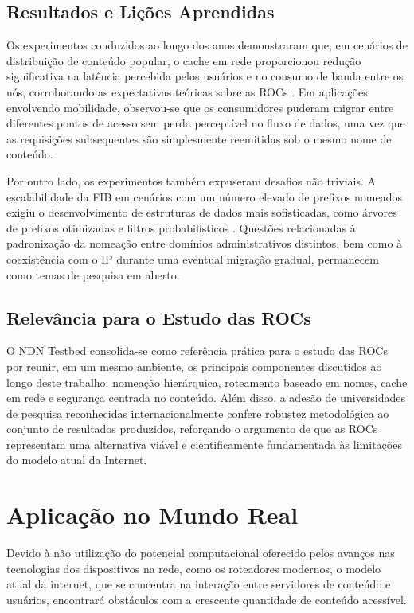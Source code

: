 \documentclass[12pt]{article}
\begin{document}
\subsection{Resultados e Lições Aprendidas}

Os experimentos conduzidos ao longo dos anos demonstraram que, em cenários de distribuição de conteúdo popular, o cache em rede proporcionou redução significativa na latência percebida pelos usuários e no consumo de banda entre os nós, corroborando as expectativas teóricas sobre as ROCs \cite{zhang2014ndn}. Em aplicações envolvendo mobilidade, observou-se que os consumidores puderam migrar entre diferentes pontos de acesso sem perda perceptível no fluxo de dados, uma vez que as requisições subsequentes são simplesmente reemitidas sob o mesmo nome de conteúdo.

Por outro lado, os experimentos também expuseram desafios não triviais. A escalabilidade da FIB em cenários com um número elevado de prefixos nomeados exigiu o desenvolvimento de estruturas de dados mais sofisticadas, como árvores de prefixos otimizadas e filtros probabilísticos \cite{afanasyev2018brief}. Questões relacionadas à padronização da nomeação entre domínios administrativos distintos, bem como à coexistência com o IP durante uma eventual migração gradual, permanecem como temas de pesquisa em aberto.

\subsection{Relevância para o Estudo das ROCs}

O NDN Testbed consolida-se como referência prática para o estudo das ROCs por reunir, em um mesmo ambiente, os principais componentes discutidos ao longo deste trabalho: nomeação hierárquica, roteamento baseado em nomes, cache em rede e segurança centrada no conteúdo. Além disso, a adesão de universidades de pesquisa reconhecidas internacionalmente confere robustez metodológica ao conjunto de resultados produzidos, reforçando o argumento de que as ROCs representam uma alternativa viável e cientificamente fundamentada às limitações do modelo atual da Internet.

\section{Aplicação no Mundo Real}

Devido à não utilização do potencial computacional oferecido pelos avanços nas tecnologias dos dispositivos na rede, como os roteadores modernos, o modelo atual da internet, que se concentra na interação entre servidores de conteúdo e usuários, encontrará obstáculos com a crescente quantidade de conteúdo acessível.
\end{document}

